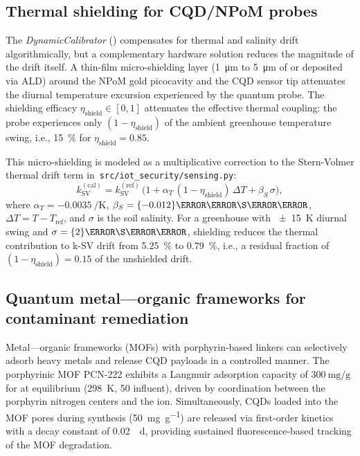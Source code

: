 \documentclass[11pt,a4paper]{article}
\begin{document}
\subsection{Thermal shielding for CQD/NPoM probes}
\label{SI-sec:thermal_shielding}

The \textit{DynamicCalibrator} () compensates for thermal
and salinity drift algorithmically, but a complementary hardware solution
reduces the magnitude of the drift itself. A thin-film micro-shielding layer
(\qty{1}{\micro\meter} to \qty{5}{\micro\meter} of  or  deposited via ALD)
around the NPoM gold picocavity and the CQD sensor tip attenuates the diurnal
temperature excursion experienced by the quantum probe. The shielding efficacy
$\eta_{\mathrm{shield}} \in [0,1]$ attenuates the effective thermal coupling:
the probe experiences only $(1 - \eta_{\mathrm{shield}})$ of the ambient
greenhouse temperature swing, i.e., \qty{15}{\percent} for
$\eta_{\mathrm{shield}} = 0.85$.

This micro-shielding is modeled as a multiplicative correction to the
Stern-Volmer thermal drift term in~\texttt{src/iot\_security/sensing.py}:
\[
k_{\mathrm{SV}}^{\mathrm{(cal)}} = k_{\mathrm{SV}}^{\mathrm{(ref)}} \,
\bigl(1 + \alpha_T \,(1 - \eta_{\mathrm{shield}})\,\Delta T +
\beta_S \,\sigma\bigr),
\]
where $\alpha_T = \qty{-0.0035}{\per\K}$, $\beta_S = \qty{-0.012}{\per\milli\S\per\cm}$,
$\Delta T = T - T_{\mathrm{ref}}$, and $\sigma$ is the soil salinity. For a
greenhouse with \qty{\pm 15}{\K} diurnal swing and
$\sigma = \qty{2}{\milli\S\per\cm}$, shielding reduces the thermal contribution
to k-SV drift from \qty{5.25}{\percent} to \qty{0.79}{\percent}, i.e., a
residual fraction of $(1 - \eta_{\mathrm{shield}}) = 0.15$ of the unshielded
drift.

\subsection{Quantum metal---organic frameworks for contaminant remediation}
\label{SI-sec:mof}

Metal---organic frameworks (MOFs) with porphyrin-based linkers can selectively
adsorb heavy metals and release CQD payloads in a controlled manner. The
porphyrinic MOF PCN-222 exhibits a Langmuir adsorption capacity of
$\qty{300}{\mg\per\g}$ for  at equilibrium
(\qty{298}{\K}, \qty{50}{\ppb} influent), driven by coordination between the
porphyrin nitrogen centers and the  ion.
Simultaneously, CQDs loaded into the MOF pores during synthesis
(\qty{50}{\mg\per\g}) are released via first-order kinetics with a
decay constant of \qty{0.02}{\per\day}, providing sustained
fluorescence-based tracking of the MOF degradation.
\end{document}
